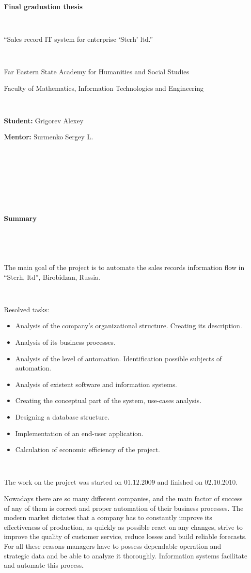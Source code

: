 \documentclass[a4paper, 12pt]{article}
\begin{document}
\begin{center}

\


{\large
\textbf{Final graduation thesis}

\

``Sales record IT system for enterprise `Sterh' ltd.''
}

\


Far Eastern State Academy for Humanities and Social Studies

Faculty of Mathematics, Information Technologies and Engineering

\

\textbf{Student:} Grigorev Alexey

\textbf{Mentor:} Surmenko Sergey L.

\

\

\

\

{\large\textbf{Summary}}

\end{center}

\

\

The main goal of the project is to automate the sales records information flow in ``Sterh, ltd'', Birobidzan, Russia.

\


Resolved tasks:
\begin{itemize}
\item Analysis of the company's organizational structure. Creating its description.
\item Analysis of its business processes.
\item Analysis of the level of automation. Identification possible subjects of automation.
\item Analysis of existent software and information systems.
\item Creating the conceptual part of the system, use-cases analysis.
\item Designing a database structure.
\item Implementation of an end-user application.
\item Calculation of economic efficiency of the project.
\end{itemize}

\

The work on the project was started on 01.12.2009 and finished on 02.10.2010.


\newpage
Nowadays there are so many different companies, and the main factor of success of any of them is correct and proper automation of their business processes. The modern market dictates that a company has to constantly improve its effectiveness of production, as quickly as possible react on any changes, strive to improve the quality of customer service, reduce losses and build reliable forecasts. For all these reasons managers have to possess dependable operation and strategic data and be able to analyze it thoroughly. Information systems facilitate and automate this process.
\end{document}
